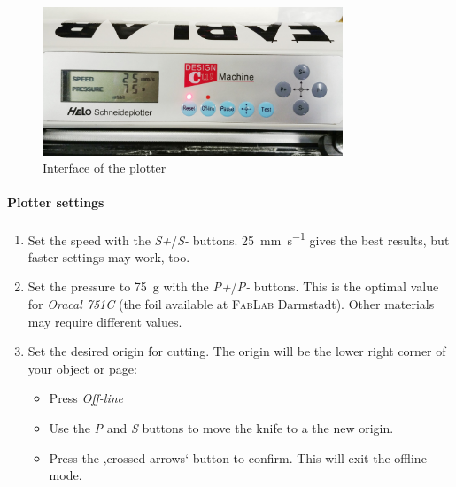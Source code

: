 \begin{figure}[htb]
\centering
\includegraphics[width=0.8\textwidth]{images/plotter}
\caption{Interface of the plotter}
\label{fig:interface}
\end{figure}

\paragraph{Plotter settings}
\begin{enumerate}
	\item Set the speed with the \textit{S+}/\textit{S-} buttons. \SI{25}{\milli\meter\per\second} gives the best results, but faster settings may work, too.
	\item Set the pressure to \SI{75}{\gram} with the \textit{P+}/\textit{P-} buttons. This is the optimal value for \textit{Oracal 751C} (the foil available at \textsc{FabLab} Darmstadt). Other materials may require different values.
	\item Set the desired origin for cutting. The origin will be the lower right corner of your object or page:
	\begin{itemize}
		\item Press \textit{Off-line}
		\item Use the \textit{P} and \textit{S} buttons to move the knife to a the new origin.
		\item Press the ‚crossed arrows‘ button to confirm. This will exit the offline mode.		
	\end{itemize}
\end{enumerate}


